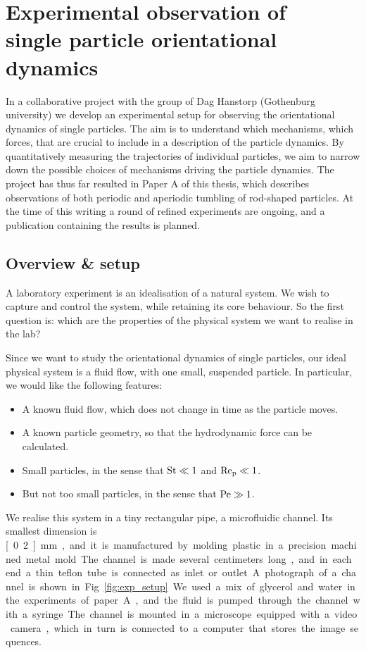 \documentclass[thesis.tex]{subfiles}
\begin{document}
\chapter[Experimental observations]{Experimental observation of \\single particle orientational dynamics}\label{sec:experiment}

In a collaborative project with the group of Dag Hanstorp (Gothenburg university) we develop an experimental setup for observing the orientational dynamics of single particles. The aim is to understand which mechanisms, which forces, that are crucial to include in a description of the particle dynamics. By quantitatively measuring the trajectories of individual particles, we aim to narrow down the possible choices of mechanisms driving the particle dynamics. The project has thus far resulted in Paper A of this thesis, which describes observations of both periodic and aperiodic tumbling of rod-shaped particles. At the time of this writing a round of refined experiments are ongoing, and a publication containing the results is planned.

\section{Overview \& setup}

A laboratory experiment is an idealisation of a natural system. We wish to capture and control the system, while retaining its core behaviour. So the first question is: which are the properties of the physical system we want to realise in the lab?

Since we want to study the orientational dynamics of single particles, our ideal physical system is a fluid flow, with one small, suspended particle. In particular, we would like the following features:
\begin{itemize}
	\item A known fluid flow, which does not change in time as the particle moves.
	\item A known particle geometry, so that the hydrodynamic force can be calculated.
	\item Small particles, in the sense that $\mbox{St}\ll1$ and $\mbox{Re}_{\mathrm p}\ll1$.
	\item But not too small particles, in the sense that $\mbox{Pe}\gg1$.
\end{itemize}
We realise this system in a tiny rectangular pipe, a microfluidic channel. Its smallest dimension is \unit[0.2]{mm}, and it is manufactured by molding plastic in a precision machined metal mold. The channel is made several centimeters long, and in each end a thin teflon tube is connected as inlet or outlet. A photograph of a channel is shown in Fig.~\ref{fig:exp_setup}. We used a mix of glycerol and water in the experiments of paper A, and the fluid is pumped through the channel with a syringe. The channel is mounted in a microscope equipped with a video camera, which in turn is connected to a computer that stores the image sequences.
\end{document}
